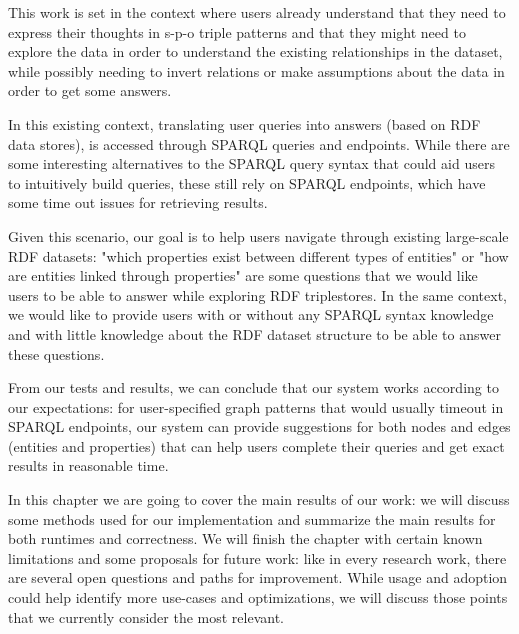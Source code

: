 This work is set in the context where users already understand that they need to express their thoughts in s-p-o triple patterns and that they might need to explore the data in order to understand the existing relationships in the dataset, while possibly needing to invert relations or make assumptions about the data in order to get some answers.

In this existing context, translating user queries into answers (based on RDF data stores), is accessed through SPARQL queries and endpoints. While there are some interesting alternatives to the SPARQL query syntax that could aid users to intuitively build queries, these still rely on SPARQL endpoints, which have some time out issues for retrieving results.

Given this scenario, our goal is to help users navigate through existing large-scale RDF datasets: "which properties exist between different types of entities" or "how are entities linked through properties" are some questions that we would like users to be able to answer while exploring RDF triplestores. In the same context, we would like to provide users with or without any SPARQL syntax knowledge and with little knowledge about the RDF dataset structure to be able to answer these questions.

From our tests and results, we can conclude that our system works according to our expectations: for user-specified graph patterns that would usually timeout in SPARQL endpoints, our system can provide suggestions for both nodes and edges (entities and properties) that can help users complete their queries and get exact results in reasonable time.

In this chapter we are going to cover the main results of our work: 
we will discuss some methods used for our implementation and summarize the main results for both runtimes and correctness. 
We will finish the chapter with certain known limitations and some proposals for future work: 
like in every research work, there are several open questions and paths for improvement. 
While usage and adoption could help identify more use-cases and optimizations, 
we will discuss those points that we currently consider the most relevant.


